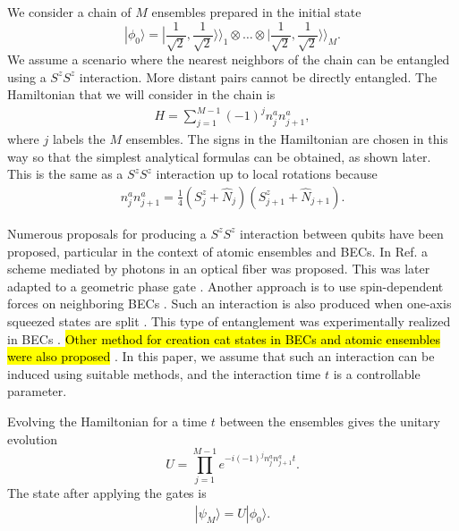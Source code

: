 \documentclass[%
  prx,%
  twocolumn,%
  preprintnumbers,%
  amsmath,%
  amssymb,%
  superscriptaddress%
]{revtex4}
\begin{document}
We consider a chain of $ M $ ensembles prepared in the initial state
%
%
\begin{equation}
|\phi_0 \rangle=|\frac{1}{\sqrt{2}},\frac{1}{\sqrt{2}}\rangle\rangle_{1}\otimes\dots\otimes|\frac{1}{\sqrt{2}},\frac{1}{\sqrt{2}}\rangle\rangle_{M} .  \label{initstate}
\end{equation}
%
We assume a scenario where the nearest neighbors of the chain can be entangled using a $ S^z S^z $  interaction. More distant pairs cannot be directly entangled.  The Hamiltonian that we will consider in the chain is
%
\begin{align}
H=  \sum_{j=1}^{M-1} (-1)^j n_j^a n_{j+1}^a ,
\label{mainham}
\end{align}
%
where $ j$ labels the  $M $ ensembles. The signs in the Hamiltonian are chosen in this way so that the simplest analytical formulas can be obtained, as shown later.
 This is the same as a $ S^z S^z $ interaction up to local rotations because
%
\begin{align}
n^a_j n_{j+1}^a = \frac{1}{4} (S^z_j + \hat{N}_j) (S^z_{j+1} + \hat{N}_{j+1} ).
\end{align}

Numerous proposals for producing a $ S^z S^z $ interaction between qubits have been proposed, particular in the context of atomic ensembles and BECs.  In Ref. \cite{pyrkov2013entanglement} a scheme mediated by photons in an optical fiber was proposed.  This was later adapted to a geometric phase gate \cite{hussain2014geometric}. Another approach is to use spin-dependent forces on neighboring BECs \cite{treutlein2006}.
Such an interaction is also produced when one-axis squeezed states are split \cite{Jing_2019}.  This type of entanglement was  experimentally realized in BECs \cite{fadel2018spatial,Colciaghi2023}. \hl{Other method for creation cat states in BECs and atomic ensembles were also proposed }\cite{simon14,nori21}.  In this paper, we assume that such an interaction can be induced using suitable methods, and the interaction time $ t $ is a controllable parameter.

Evolving the Hamiltonian for a time $ t $ between the ensembles gives the unitary evolution
%
\begin{equation}
U=\prod^{M-1}_{j=1} e^{- i (-1)^j  n^a_j n^a_{j+1} t} .
\end{equation}
%
The state after applying the gates is
%
\begin{align}
|\psi_M \rangle = U | \phi_0 \rangle .
\end{align}
\end{document}
